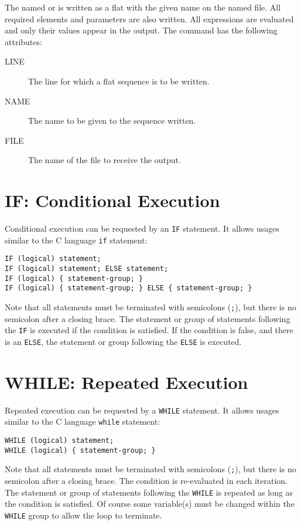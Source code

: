The named  or  is
written as a flat  with the given
name on the named file. 
All required elements and parameters are also written.
All expressions are evaluated and only their values appear in the
output. 
The command has the following attributes:
\begin{description}
\item[LINE]
  The line for which a flat sequence is to be written.
\item[NAME]
  The name to be given to the sequence written.
\item[FILE]
  The name of the file to receive the output.
\end{description}

\section{IF: Conditional Execution}
\label{sec:if}
Conditional execution can be requested by an \texttt{IF} statement.
It allows usages similar to the C language \texttt{if} statement:
\begin{verbatim}
IF (logical) statement;
IF (logical) statement; ELSE statement;
IF (logical) { statement-group; }
IF (logical) { statement-group; } ELSE { statement-group; }
\end{verbatim}
Note that all statements must be terminated with semicolons (\texttt{;}),
but there is no semicolon after a closing brace.
The statement or group of statements following the \texttt{IF} is
executed if the condition is satisfied.
If the condition is false, and there is an \texttt{ELSE},
the statement or group following the \texttt{ELSE} is executed.

\section{WHILE: Repeated Execution}
\label{sec:while}
Repeated execution can be requested by a \texttt{WHILE} statement.
It allows usages similar to the C language \texttt{while} statement:
\begin{verbatim}
WHILE (logical) statement;
WHILE (logical) { statement-group; }
\end{verbatim}
Note that all statements must be terminated with semicolons (\texttt{;}),
but there is no semicolon after a closing brace.
The condition is re-evaluated in each iteration.
The statement or group of statements following the \texttt{WHILE} is
repeated as long as the condition is satisfied.
Of course some variable(s) must be changed within the \texttt{WHILE} group 
to allow the loop to terminate.

